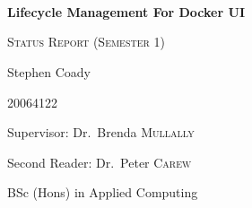 \begin{titlepage}
	\mbox{}\\
	\mbox{}\\
	\mbox{}\\
	{\huge\bfseries Lifecycle Management For Docker UI\par}
	\vspace{1cm}
	{\scshape\large Status Report (Semester 1)\par}
	\vspace{3cm}
	{\Large Stephen Coady\par}
	\vspace{1cm}
	{\Large 20064122\par}
	\vspace{3cm}\par
	\vfill
	{\Large Supervisor: Dr.~Brenda \textsc{Mullally}}
	\vspace{1cm}\par
	{\Large Second Reader: Dr.~Peter \textsc{Carew}}
	\vspace{2cm}\par
	{\Large BSc (Hons) in Applied Computing\par}


	\vfill
	
\end{titlepage}

